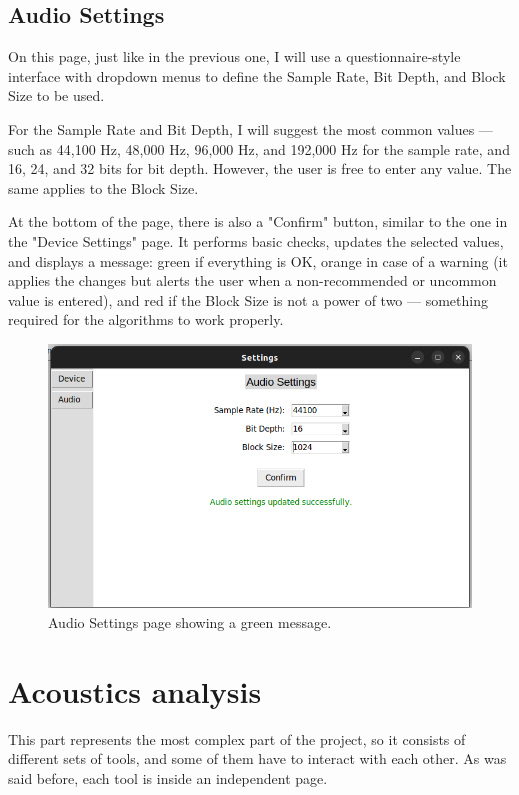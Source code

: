 \subsection{Audio Settings}

On this page, just like in the previous one, I will use a questionnaire-style interface with dropdown menus to define the Sample Rate, Bit Depth, and Block Size to be used.

For the Sample Rate and Bit Depth, I will suggest the most common values — such as 44,100 Hz, 48,000 Hz, 96,000 Hz, and 192,000 Hz for the sample rate, and 16, 24, and 32 bits for bit depth. However, the user is free to enter any value. The same applies to the Block Size.

At the bottom of the page, there is also a "Confirm" button, similar to the one in the "Device Settings" page. It performs basic checks, updates the selected values, and displays a message: green if everything is OK, orange in case of a warning (it applies the changes but alerts the user when a non-recommended or uncommon value is entered), and red if the Block Size is not a power of two — something required for the algorithms to work properly.

\begin{figure}[H]
	\centering
	\includegraphics[width=0.8
	\linewidth]{Figures/AudSet.png}
	\caption{Audio Settings page showing a green message.}
	\label{fig:Audio Settings}
\end{figure}



\section{Acoustics analysis}

This part represents the most complex part of the project, so it consists of different sets of tools, and some of them have to interact with each other. As was said before, each tool is inside an independent page.

